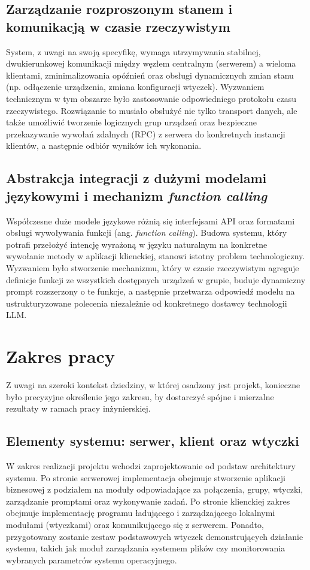 \subsection{Zarządzanie rozproszonym stanem i komunikacją w czasie rzeczywistym}
\label{subsec:zarzadzanie_stanem}
System, z uwagi na swoją specyfikę, wymaga utrzymywania stabilnej, dwukierunkowej komunikacji między węzłem centralnym (serwerem) a wieloma klientami, zminimalizowania opóźnień oraz obsługi dynamicznych zmian stanu (np. odłączenie urządzenia, zmiana konfiguracji wtyczek). Wyzwaniem technicznym w tym obszarze było zastosowanie odpowiedniego protokołu czasu rzeczywistego. Rozwiązanie to musiało obsłużyć nie tylko transport danych, ale także umożliwić tworzenie logicznych grup urządzeń oraz bezpieczne przekazywanie wywołań zdalnych (RPC) z serwera do konkretnych instancji klientów, a następnie odbiór wyników ich wykonania.

\subsection{Abstrakcja integracji z dużymi modelami językowymi i mechanizm \textit{function calling}}
\label{subsec:abstrakcja_llm}
Współczesne duże modele językowe różnią się interfejsami API oraz formatami obsługi wywoływania funkcji (ang. \textit{function calling}). Budowa systemu, który potrafi przełożyć intencję wyrażoną w języku naturalnym na konkretne wywołanie metody w aplikacji klienckiej, stanowi istotny problem technologiczny. Wyzwaniem było stworzenie mechanizmu, który w czasie rzeczywistym agreguje definicje funkcji ze wszystkich dostępnych urządzeń w grupie, buduje dynamiczny prompt rozszerzony o te funkcje, a następnie przetwarza odpowiedź modelu na ustrukturyzowane polecenia niezależnie od konkretnego dostawcy technologii LLM.

\section{Zakres pracy}
\label{sec:zakres}
Z uwagi na szeroki kontekst dziedziny, w której osadzony jest projekt, konieczne było precyzyjne określenie jego zakresu, by dostarczyć spójne i mierzalne rezultaty w ramach pracy inżynierskiej.

\subsection{Elementy systemu: serwer, klient oraz wtyczki}
\label{subsec:elementy_systemu}
W zakres realizacji projektu wchodzi zaprojektowanie od podstaw architektury systemu. Po stronie serwerowej implementacja obejmuje stworzenie aplikacji biznesowej z podziałem na moduły odpowiadające za połączenia, grupy, wtyczki, zarządzanie promptami oraz wykonywanie zadań. Po stronie klienckiej zakres obejmuje implementację programu ładującego i zarządzającego lokalnymi modułami (wtyczkami) oraz komunikującego się z serwerem. Ponadto, przygotowany zostanie zestaw podstawowych wtyczek demonstrujących działanie systemu, takich jak moduł zarządzania systemem plików czy monitorowania wybranych parametrów systemu operacyjnego.

